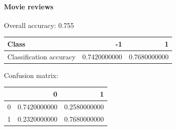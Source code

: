 \paragraph{Movie reviews \\}
Overall accuracy: 0.755

\begin{tabular}{l|r|r}
Class & -1 & 1 \\
\hline
Classification accuracy & 0.7420000000 & 0.7680000000 \\
\end{tabular}

Confusion matrix:

\begin{tabular}{l|r|r}
 & 0 & 1 \\
\hline
0 & 0.7420000000 & 0.2580000000 \\
1 & 0.2320000000 & 0.7680000000 \\
\end{tabular}

